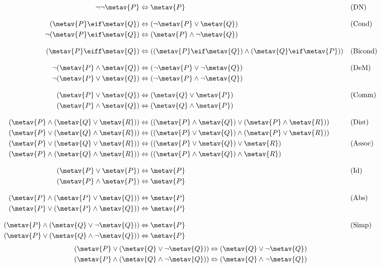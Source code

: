 \begin{align*}
\lnot\lnot \metav{P} & \Leftrightarrow \metav{P} && \text{(DN)}\\[2ex]
(\metav{P} \eif \metav{Q}) & \Leftrightarrow (\lnot \metav{P} \lor \metav{Q})
&& \text{(Cond)}\\
\lnot(\metav{P} \eif \metav{Q}) & \Leftrightarrow (\metav{P} \land \lnot\metav{Q}) \\[2ex]
(\metav{P} \eiff \metav{Q}) & \Leftrightarrow ((\metav{P} \eif \metav{Q}) \land  (\metav{Q} \eif \metav{P}))
&& \text{(Bicond)}\\[2ex]
\lnot(\metav{P} \land \metav{Q}) & \Leftrightarrow (\lnot\metav{P} \lor \lnot\metav{Q})
&& \text{(DeM)}\\
\lnot(\metav{P} \lor \metav{Q}) & \Leftrightarrow (\lnot\metav{P} \land \lnot\metav{Q}) \\[2ex]
(\metav{P} \lor \metav{Q}) & \Leftrightarrow (\metav{Q} \lor \metav{P}) & &\text{(Comm)}\\
(\metav{P} \land \metav{Q}) & \Leftrightarrow (\metav{Q} \land \metav{P})\\[2ex]
(\metav{P} \land (\metav{Q} \lor \metav{R})) & \Leftrightarrow ((\metav{P} \land \metav{Q}) \lor (\metav{P} \land \metav{R}))
&& \text{(Dist)}\\
(\metav{P} \lor (\metav{Q} \land \metav{R})) & \Leftrightarrow ((\metav{P} \lor \metav{Q}) \land (\metav{P} \lor \metav{R}))\\
(\metav{P} \lor (\metav{Q} \lor \metav{R})) & \Leftrightarrow ((\metav{P} \lor \metav{Q}) \lor \metav{R}) & &\text{(Assoc)}\\
(\metav{P} \land (\metav{Q} \land \metav{R})) & \Leftrightarrow ((\metav{P} \land \metav{Q}) \land \metav{R})\\[2ex]
(\metav{P} \lor \metav{P}) & \Leftrightarrow \metav{P} && \text{(Id)}\\
(\metav{P} \land \metav{P}) & \Leftrightarrow \metav{P}\\[2ex]
(\metav{P} \land (\metav{P} \lor \metav{Q})) & \Leftrightarrow \metav{P}&& \text{(Abs)}\\
(\metav{P} \lor (\metav{P} \land \metav{Q})) & \Leftrightarrow \metav{P}\\[2ex]
(\metav{P} \land (\metav{Q} \lor \lnot\metav{Q})) & \Leftrightarrow \metav{P}  && \text{(Simp)}\\
(\metav{P} \lor (\metav{Q} \land \lnot\metav{Q})) & \Leftrightarrow \metav{P}
\end{align*}
\begin{align*}
(\metav{P} \lor (\metav{Q} \lor \lnot\metav{Q})) & \Leftrightarrow (\metav{Q} \lor \lnot\metav{Q}) \\
(\metav{P} \land (\metav{Q} \land \lnot\metav{Q})) & \Leftrightarrow (\metav{Q} \land \lnot\metav{Q})
\end{align*}
\fi

